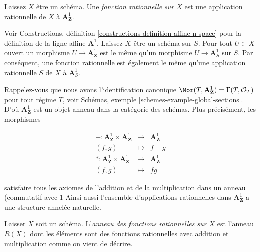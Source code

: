 \begin{definition}

\label{definition-rational-function}
Laissez $X$ être un schéma. Une {\it fonction rationnelle sur $X$} est une application rationnelle de $X$ à $\mathbf{A}^1_{\mathbf{Z}}$.
\end{definition}

\noindent
Voir Constructions, définition \ref{constructions-definition-affine-n-space} pour la définition de la ligne affine $\mathbf{A}^1$. Laissez $X$ être un schéma sur $S$. Pour tout $U \subset X$ ouvert un morphisme $U \to \mathbf{A}^1_{\mathbf{Z}}$ est le même qu'un morphisme $U \to \mathbf{A}^1_S$ sur $S$. Par conséquent, une fonction rationnelle est également le même qu'une application rationnelle $S$ de $X$ à $\mathbf{A}^1_S$.

\medskip\noindent

Rappelez-vous que nous avons l'identification canonique
$\Mor(T, \mathbf{A}^1_{\mathbf{Z}}) = \Gamma(T, \mathcal{O}_T)$
pour tout régime $T$, voir Schémas, exemple \ref{schemes-example-global-sections}. D'où $\mathbf{A}^1_{\mathbf{Z}}$ est un objet-anneau dans la catégorie des schémas. Plus précisément, les morphismes

\begin{eqnarray*}
+ : \mathbf{A}^1_{\mathbf{Z}} \times \mathbf{A}^1_{\mathbf{Z}}
& \longrightarrow &
\mathbf{A}^1_{\mathbf{Z}} \\
(f, g) & \longmapsto & f + g \\
* : \mathbf{A}^1_{\mathbf{Z}} \times \mathbf{A}^1_{\mathbf{Z}}
& \longrightarrow &
\mathbf{A}^1_{\mathbf{Z}} \\
(f, g) & \longmapsto & fg
\end{eqnarray*}

satisfaire tous les axiomes de l'addition et de la multiplication dans un anneau (commutatif avec $1$ Ainsi aussi l'ensemble d'applications rationnelles dans $\mathbf{A}^1_{\mathbf{Z}}$ a une structure annelée naturelle.

\begin{definition}

\label{definition-ring-of-rational-functions}

Laisser $X$ soit un schéma. L'{\it anneau des fonctions rationnelles sur $X$} est l'anneau $R(X)$ dont les éléments sont des fonctions rationnelles avec addition et multiplication comme on vient de décrire.

\end{definition}

